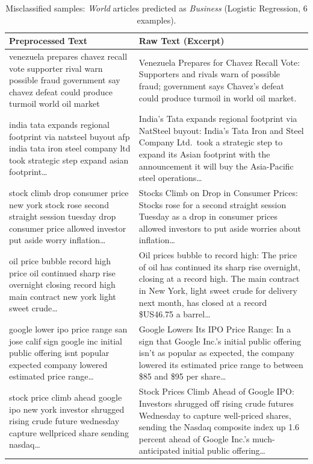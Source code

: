 \begin{table}[htbp]
\centering
\caption{Misclassified samples: \textit{World} articles predicted as \textit{Business} (Logistic Regression, 6 examples).}
\label{tab:logreg-world-biz}
\small
\begin{tabular}{p{0.65\textheight} p{0.65\textheight}}
\toprule
\textbf{Preprocessed Text} & \textbf{Raw Text (Excerpt)} \\
\midrule
venezuela prepares chavez recall vote supporter rival warn possible fraud government say chavez defeat could produce turmoil world oil market &
Venezuela Prepares for Chavez Recall Vote: Supporters and rivals warn of possible fraud; government says Chavez's defeat could produce turmoil in world oil market. \\
\addlinespace
india tata expands regional footprint via natsteel buyout afp india tata iron steel company ltd took strategic step expand asian footprint\ldots &
India's Tata expands regional footprint via NatSteel buyout: India's Tata Iron and Steel Company Ltd.\ took a strategic step to expand its Asian footprint with the announcement it will buy the Asia-Pacific steel operations\ldots \\
\addlinespace
stock climb drop consumer price new york stock rose second straight session tuesday drop consumer price allowed investor put aside worry inflation\ldots &
Stocks Climb on Drop in Consumer Prices: Stocks rose for a second straight session Tuesday as a drop in consumer prices allowed investors to put aside worries about inflation\ldots \\
\addlinespace
oil price bubble record high price oil continued sharp rise overnight closing record high main contract new york light sweet crude\ldots &
Oil prices bubble to record high: The price of oil has continued its sharp rise overnight, closing at a record high. The main contract in New York, light sweet crude for delivery next month, has closed at a record \$US46.75 a barrel\ldots \\
\addlinespace
google lower ipo price range san jose calif sign google inc initial public offering isnt popular expected company lowered estimated price range\ldots &
Google Lowers Its IPO Price Range: In a sign that Google Inc.'s initial public offering isn't as popular as expected, the company lowered its estimated price range to between \$85 and \$95 per share\ldots \\
\addlinespace
stock price climb ahead google ipo new york investor shrugged rising crude future wednesday capture wellpriced share sending nasdaq\ldots &
Stock Prices Climb Ahead of Google IPO: Investors shrugged off rising crude futures Wednesday to capture well-priced shares, sending the Nasdaq composite index up 1.6 percent ahead of Google Inc.'s much-anticipated initial public offering\ldots \\
\bottomrule
\end{tabular}
\end{table}

